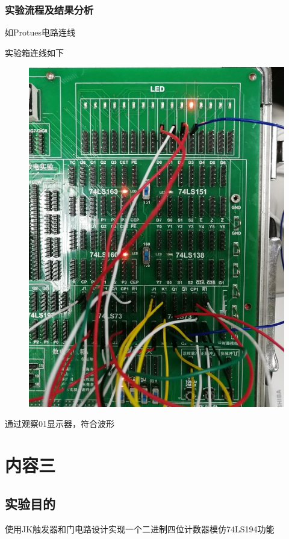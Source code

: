\documentclass[11pt,UTF8]{ctexart}
\begin{document}
\subsubsection{实验流程及结果分析}
\par 如Protues电路连线
\par 实验箱连线如下
\begin{figure}[H]
    \centering
    \includegraphics[width=0.6\linewidth]{fig/adder_2.jpg}
\end{figure}
\par 通过观察01显示器，符合波形



\section{内容三}
\subsection{实验目的}
使用JK触发器和门电路设计实现一个二进制四位计数器模仿74LS194功能
\end{document}

